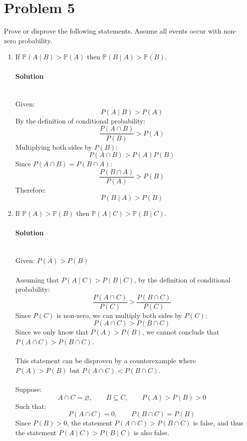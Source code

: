 ﻿\documentclass[12pt]{article}
\begin{document}
\section*{Problem 5}
Prove or disprove the following statements. Assume all events occur with non-zero probability.

\begin{enumerate}[label=(\alph*), leftmargin=*]
\item If $\mathbb{P}(A\mid B)>\mathbb{P}(A)$ then $\mathbb{P}(B\mid A)>\mathbb{P}(B)$.
\paragraph{Solution}\mbox{}\\
Given:
\[
P(A\mid B)>P(A)
\]
By the definition of conditional probability:
\[
\frac{P(A\cap B)}{P(B)}>P(A)
\]
Multiplying both sides by $P(B)$:
\[
P(A\cap B)>P(A)P(B)
\]
Since $P(A\cap B)=P(B\cap A)$:
\[
\frac{P(B\cap A)}{P(A)}>P(B)
\]
Therefore:
\[
\boxed{P(B\mid A)>P(B)}
\]

\item If $\mathbb{P}(A)>\mathbb{P}(B)$ then $\mathbb{P}(A\mid C)>\mathbb{P}(B\mid C)$.
\paragraph{Solution}\mbox{}\\
Given: $P(A)>P(B)$\\\\
Assuming that $P(A\mid C)>P(B\mid C)$, by the definition of conditional probability:
\[
\frac{P(A\cap C)}{P(C)}>\frac{P(B\cap C)}{P(C)}
\]
Since $P(C)$ is non-zero, we can multiply both sides by $P(C)$:
\[
P(A\cap C)>P(B\cap C)
\]
Since we only know that $P(A)>P(B)$, we cannot conclude that $P(A\cap C)>P(B\cap C)$.\\\\
This statement can be disproven by a counterexample where $P(A)>P(B)$ but $P(A\cap C)<P(B\cap C)$.\\\\
Suppose:
\[
A\cap C=\varnothing,\qquad B\subseteq C,\qquad P(A)>P(B)>0
\]
Such that:
\[P(A\cap C)=0,\qquad P(B\cap C)=P(B)\]
Since $P(B)>0$, the statement $P(A\cap C)>P(B\cap C)$ is false, and thus the statement $P(A\mid C)>P(B\mid C)$ is also false.
\end{enumerate}
\end{document}
